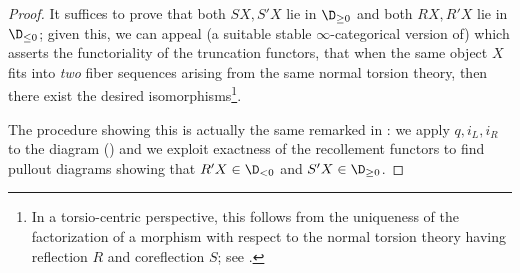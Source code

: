 \begin{proof}
It suffices to prove that both $SX, S'X$ lie in $\D_{\ge 0}$ and both $RX, R'X$ lie in $\D_{\le 0}$; given this, we can appeal (a suitable stable $\infty$-categorical version of) \cite[ \textbf{1.1.9}]{BBDPervers} which asserts the functoriality of the truncation functors, \ie that when the same object $X$ fits into \emph{two} fiber sequences arising from the same normal torsion theory, then there exist the desired isomorphisms\footnote{In a torsio-centric perspective, this follows from the uniqueness of the factorization of a morphism with respect to the normal torsion theory having reflection $R$ and coreflection $S$; see .}.

The procedure showing this is actually the same remarked in : we apply $q,i_L, i_R$ to the diagram () and we exploit exactness of the recollement functors to find pullout diagrams showing that $R'X\in \D_{<0}$ and $S'X\in \D_{\ge 0}$.


\end{proof}
